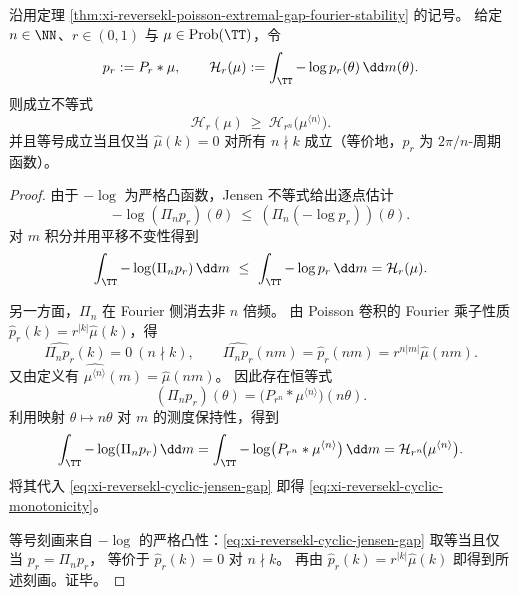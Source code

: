 \begin{theorem}[循环对称化的半径重整化单调性]\label{thm:xi-reversekl-radius-renormalization-cyclic-symmetrization}
沿用定理 \ref{thm:xi-reversekl-poisson-extremal-gap-fourier-stability} 的记号。
给定 \(n\in\NN\)、\(r\in(0,1)\) 与 \(\mu\in\mathrm{Prob}(\TT)\)，令
\[
p_r:=P_r*\mu,\qquad \mathcal H_r(\mu):=\int_{\TT}-\log p_r(\theta)\,\dd m(\theta).
\]
则成立不等式
\begin{equation}\label{eq:xi-reversekl-cyclic-monotonicity}
\boxed{\ \mathcal H_r(\mu)\ \ge\ \mathcal H_{r^n}\!\bigl(\mu^{\langle n\rangle}\bigr).\ }
\end{equation}
并且等号成立当且仅当 \(\widehat\mu(k)=0\) 对所有 \(n\nmid k\) 成立（等价地，\(p_r\) 为 \(2\pi/n\)-周期函数）。
\end{theorem}
\begin{proof}
由于 \(-\log\) 为严格凸函数，Jensen 不等式给出逐点估计
\[
-\log (\Pi_n p_r)(\theta)\ \le\ (\Pi_n(-\log p_r))(\theta).
\]
对 \(m\) 积分并用平移不变性得到
\begin{equation}\label{eq:xi-reversekl-cyclic-jensen-gap}
\int_{\TT}-\log(\Pi_n p_r)\,\dd m\ \le\ \int_{\TT}-\log p_r\,\dd m=\mathcal H_r(\mu).
\end{equation}

另一方面，\(\Pi_n\) 在 Fourier 侧消去非 \(n\) 倍频。
由 Poisson 卷积的 Fourier 乘子性质 \(\widehat p_r(k)=r^{|k|}\widehat\mu(k)\)，得
\[
\widehat{\Pi_n p_r}(k)=0\ (n\nmid k),\qquad
\widehat{\Pi_n p_r}(nm)=\widehat p_r(nm)=r^{n|m|}\widehat\mu(nm).
\]
又由定义有 \(\widehat{\mu^{\langle n\rangle}}(m)=\widehat\mu(nm)\)。
因此存在恒等式
\[
(\Pi_n p_r)(\theta)=\bigl(P_{r^n}*\mu^{\langle n\rangle}\bigr)(n\theta).
\]
利用映射 \(\theta\mapsto n\theta\) 对 \(m\) 的测度保持性，得到
\[
\int_{\TT}-\log(\Pi_n p_r)\,\dd m
=\int_{\TT}-\log\bigl(P_{r^n}*\mu^{\langle n\rangle}\bigr)\,\dd m
=\mathcal H_{r^n}\!\bigl(\mu^{\langle n\rangle}\bigr).
\]
将其代入 \eqref{eq:xi-reversekl-cyclic-jensen-gap} 即得 \eqref{eq:xi-reversekl-cyclic-monotonicity}。

等号刻画来自 \(-\log\) 的严格凸性：\eqref{eq:xi-reversekl-cyclic-jensen-gap} 取等当且仅当 \(p_r=\Pi_n p_r\)，
等价于 \(\widehat p_r(k)=0\) 对 \(n\nmid k\)。
再由 \(\widehat p_r(k)=r^{|k|}\widehat\mu(k)\) 即得到所述刻画。证毕。
\end{proof}

